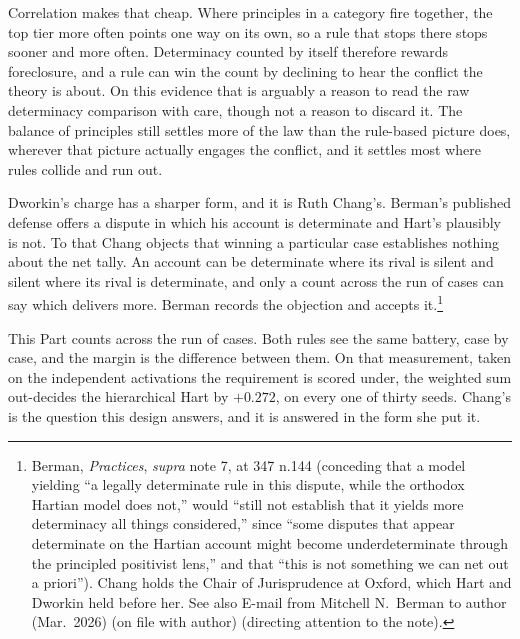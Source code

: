 Correlation makes that cheap. Where principles in a category fire
together, the top tier more often points one way on its own, so a rule that
stops there stops sooner and more often. Determinacy counted by itself therefore rewards foreclosure, and a
rule can win the count by declining to hear the conflict the theory is
about. On this evidence that is arguably a reason to read the raw determinacy
comparison with care, though not a reason to discard it. The balance of principles still settles more of
the law than the rule-based picture does, wherever that picture actually
engages the conflict, and it settles most where rules collide and run
out.

Dworkin's charge has a sharper form, and it is Ruth Chang's. Berman's
published defense offers a dispute in which his account is determinate and
Hart's plausibly is not. To that Chang objects that winning a particular
case establishes nothing about the net tally. An account can be determinate where
its rival is silent and silent where its rival is determinate, and only a
count across the run of cases can say which delivers more. Berman records
the objection and accepts it.\footnote{Berman, \textit{Practices},
\textit{supra} note 7, at 347 n.144 (conceding that a model yielding ``a
legally determinate rule in this dispute, while the orthodox Hartian model
does not,'' would ``still not establish that it yields more determinacy all
things considered,'' since ``some disputes that appear determinate on the
Hartian account might become underdeterminate through the principled
positivist lens,'' and that ``this is not something we can net out a
priori''). Chang holds the Chair of Jurisprudence at Oxford, which Hart
and Dworkin held before her. See also E-mail from Mitchell N.\ Berman to
author (Mar.\ 2026) (on file with author) (directing attention to the
note).}

This Part counts across the run of cases. Both rules see the
same battery, case by case, and the margin is the difference between them.
On that measurement, taken on the independent activations the requirement is
scored under, the weighted sum out-decides the hierarchical Hart by $+0.272$,
on every one of thirty seeds. Chang's is the question this design
answers, and it is answered in the form she put it.

